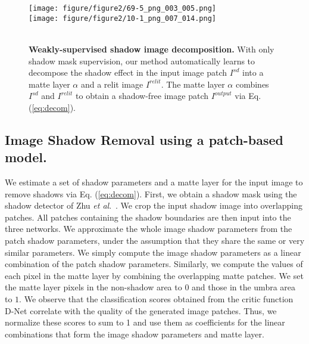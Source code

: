 \documentclass[runningheads]{llncs}
\def\etal{\emph{et al}.}
\begin{document}
\def\subfig{0.9\textwidth}
\def\subboxsize{0.15\textwidth}
\begin{figure*}[!h]
 \centering
 \texttt{[image: figure/figure2/69-5\_png\_003\_005.png]}\\
\texttt{[image: figure/figure2/10-1\_png\_007\_014.png]}\\
    \makebox[\subboxsize]{$I^{sd}$}
    \makebox[\subboxsize]{$\alpha$}
    \makebox[\subboxsize]{$I^{relit}$}
    \makebox[\subboxsize]{$I^{relit}*\alpha$}
    \makebox[\subboxsize]{$I^{sd}*(1-\alpha)$ }
    \makebox[\subboxsize]{$I^{output}$}\\
     \caption{\textbf{Weakly-supervised shadow image decomposition.} With only shadow mask supervision, our method automatically learns to decompose the shadow effect in the input image patch $I^{sd}$ into a matte layer $\alpha$ and a relit image $I^{relit}$. The matte layer $\alpha$ combines $I^{sd}$  and $I^{relit}$ to obtain a shadow-free image patch $I^{output}$ via Eq. (\ref{eq:decom}).
    }
 
    \label{fig:decompose}

\end{figure*}

\subsection{Image Shadow Removal using a patch-based model.}
\label{sec:method_im}

We estimate a set of shadow parameters and a matte layer for the input image to remove shadows via Eq. (\ref{eq:decom}). First, we obtain a shadow mask using the shadow detector of Zhu \etal~\cite{zhu18b}. We crop the input shadow image into overlapping patches. All patches containing the shadow boundaries  are then input into the three networks. We approximate the whole image shadow parameters from the patch shadow parameters, under the assumption that they share the same or very similar parameters. We simply compute the image shadow parameters as a linear combination of the patch shadow parameters. Similarly, we compute the values of each pixel in the matte layer by combining the overlapping matte patches. We set the matte layer pixels in the non-shadow area to $0$ and those in the umbra area to $1$. We observe that the classification scores obtained from the critic function D-Net correlate with the quality of the generated image patches. Thus, we normalize these scores to sum to 1 and use them as coefficients for the linear combinations that form the image shadow parameters and matte layer.
\end{document}
